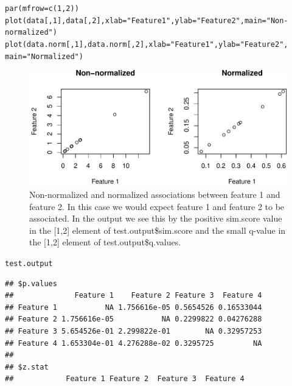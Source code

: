 \documentclass{article}\usepackage[]{graphicx}\usepackage[usenames,dvipsnames]{color}
\makeatletter
\def\maxwidth{ %
  \ifdim\Gin@nat@width>\linewidth
    \linewidth
  \else
    \Gin@nat@width
  \fi
}
\newcommand{\hlnum}[1]{\textcolor[rgb]{0.816,0.125,0.439}{#1}}%
\newcommand{\hlstr}[1]{\textcolor[rgb]{0.251,0.627,0.251}{#1}}%
\newcommand{\hlstd}[1]{\textcolor[rgb]{0.251,0.251,0.251}{#1}}%
\newcommand{\hlkwc}[1]{\textcolor[rgb]{0.251,0.251,0.251}{#1}}%
\newcommand{\hlkwd}[1]{\textcolor[rgb]{0.878,0.439,0.125}{#1}}%
\newenvironment{knitrout}{}{} %
\makeatother
\begin{document}
\begin{knitrout}
\color{fgcolor}\begin{kframe}
\begin{alltt}
\hlkwd{par}\hlstd{(}\hlkwc{mfrow}\hlstd{=}\hlkwd{c}\hlstd{(}\hlnum{1}\hlstd{,}\hlnum{2}\hlstd{))}
\hlkwd{plot}\hlstd{(data[,}\hlnum{1}\hlstd{],data[,}\hlnum{2}\hlstd{],}\hlkwc{xlab}\hlstd{=}\hlstr{"Feature 1"}\hlstd{,}\hlkwc{ylab}\hlstd{=}\hlstr{"Feature 2"}\hlstd{,}\hlkwc{main}\hlstd{=}\hlstr{"Non-normalized"}\hlstd{)}
\hlkwd{plot}\hlstd{(data.norm[,}\hlnum{1}\hlstd{],data.norm[,}\hlnum{2}\hlstd{],}\hlkwc{xlab}\hlstd{=}\hlstr{"Feature 1"}\hlstd{,}\hlkwc{ylab}\hlstd{=}\hlstr{"Feature 2"}\hlstd{,}
     \hlkwc{main}\hlstd{=}\hlstr{"Normalized"}\hlstd{)}
\end{alltt}
\end{kframe}\begin{figure}[H]
\includegraphics[width=\maxwidth]{figure/unnamed-chunk-5-1} \caption{Non-normalized and normalized associations between feature 1 and feature 2.  In this case we would expect feature 1 and feature 2 to be associated. In the output we see this by the positive sim.score value in the [1,2] element of test.output\$sim.score and the small q-value in the [1,2] element of test.output\$q.values.}\label{fig:unnamed-chunk-5}
\end{figure}
\begin{kframe}\begin{alltt}
\hlstd{test.output}
\end{alltt}
\begin{verbatim}
## $p.values
##              Feature 1    Feature 2 Feature 3  Feature 4
## Feature 1           NA 1.756616e-05 0.5654526 0.16533044
## Feature 2 1.756616e-05           NA 0.2299822 0.04276288
## Feature 3 5.654526e-01 2.299822e-01        NA 0.32957253
## Feature 4 1.653304e-01 4.276288e-02 0.3295725         NA
## 
## $z.stat
##            Feature 1 Feature 2  Feature 3  Feature 4

\end{verbatim}
\end{kframe}
\end{knitrout}
\end{document}
